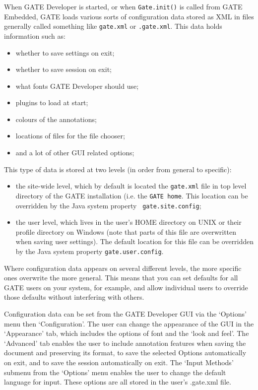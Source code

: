 When GATE Developer is started, or when {\tt Gate.init()} is called from GATE
Embedded, GATE loads various sorts of configuration data stored as XML in files
generally called something like {\tt gate.xml} or {\tt .gate.xml}. This data
holds information such as:
\begin{itemize}
  
\item whether to save settings on exit;

\item whether to save session on exit;

\item what fonts GATE Developer should use;

\item plugins to load at start;

\item colours of the annotations;

\item locations of files for the file chooser;

\item and a lot of other GUI related options;


\end{itemize}
%
This type of data is stored at two levels (in order from general to
specific):
%
\begin{itemize}
\item
  the site-wide level, which by default is located the {\tt gate.xml} file in
  top level directory of the GATE installation (i.e. the {\tt GATE home}.
  This location can be overridden by the Java system property {\tt
  gate.site.config};
\item
  the user level, which lives in the user's HOME directory on
  UNIX or their profile directory on Windows (note that parts of this file
  are overwritten when saving user settings).
  The default location for this file can be overridden by the Java system
  property {\tt gate.user.config}.
\end{itemize}
%
Where configuration data appears on several different levels, the
more specific ones overwrite the more general. This means that you can set
defaults for all GATE users on your system, for example, and allow individual
users to override those defaults without interfering with others.

Configuration data can be set from the GATE Developer GUI via the
`Options' menu then `Configuration'. The user can change the
appearance of the GUI in the `Appearance' tab, which includes the
options of font and the `look and feel'. The `Advanced' tab
enables the user to include annotation features when saving the
document and preserving its format, to save the selected Options
automatically on exit, and to save the session automatically on exit.
The `Input Methods' submenu from the `Options' menu enables the
user to change the default language for input. These options are all
stored in the user's .gate.xml file.


